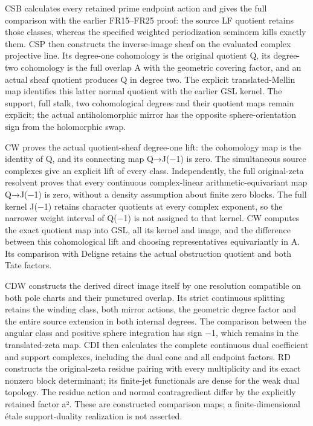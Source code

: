 \documentclass[
]{report}
\begin{document}
CSB calculates every retained prime endpoint action and gives the full
comparison with the earlier FR15--FR25 proof: the source LF quotient
retains those classes, whereas the specified weighted periodization
seminorm kills exactly them. CSP then constructs the inverse-image sheaf
on the evaluated complex projective line. Its degree-one cohomology is
the original quotient Q, its degree-two cohomology is the full overlap A
with the geometric covering factor, and an actual sheaf quotient
produces Q in degree two. The explicit translated-Mellin map identifies
this latter normal quotient with the earlier GSL kernel. The support,
full stalk, two cohomological degrees and their quotient maps remain
explicit; the actual antiholomorphic mirror has the opposite
sphere-orientation sign from the holomorphic swap.

CW proves the actual quotient-sheaf degree-one lift: the cohomology map
is the identity of Q, and its connecting map Q→J(−1) is zero. The
simultaneous source complexes give an explicit lift of every class.
Independently, the full original-zeta resolvent proves that every
continuous complex-linear arithmetic-equivariant map Q→J(−1) is zero,
without a density assumption about finite zero blocks. The full kernel
J(−1) retains character quotients at every complex exponent, so the
narrower weight interval of Q(−1) is not assigned to that kernel. CW
computes the exact quotient map into GSL, all its kernel and image, and
the difference between this cohomological lift and choosing
representatives equivariantly in A. Its comparison with Deligne retains
the actual obstruction quotient and both Tate factors.

CDW constructs the derived direct image itself by one resolution
compatible on both pole charts and their punctured overlap. Its strict
continuous splitting retains the winding class, both mirror actions, the
geometric degree factor and the entire source extension in both internal
degrees. The comparison between the angular class and positive sphere
integration has sign −1, which remains in the translated-zeta map. CDI
then calculates the complete continuous dual coefficient and support
complexes, including the dual cone and all endpoint factors. RD
constructs the original-zeta residue pairing with every multiplicity and
its exact nonzero block determinant; its finite-jet functionals are
dense for the weak dual topology. The residue action and normal
contragredient differ by the explicitly retained factor a². These are
constructed comparison maps; a finite-dimensional étale support-duality
realization is not asserted.
\end{document}

